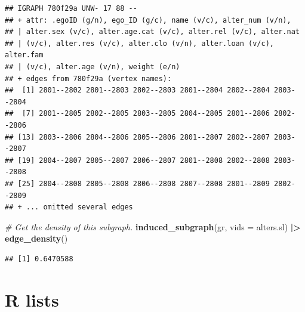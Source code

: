 \documentclass[
]{book}
\newenvironment{Shaded}{\begin{snugshade}}{\end{snugshade}}
\newcommand{\AttributeTok}[1]{\textcolor[rgb]{0.13,0.29,0.53}{#1}}
\newcommand{\CommentTok}[1]{\textcolor[rgb]{0.56,0.35,0.01}{\textit{#1}}}
\newcommand{\FunctionTok}[1]{\textcolor[rgb]{0.13,0.29,0.53}{\textbf{#1}}}
\newcommand{\NormalTok}[1]{#1}
\newcommand{\SpecialCharTok}[1]{\textcolor[rgb]{0.81,0.36,0.00}{\textbf{#1}}}
\begin{document}
\begin{verbatim}
## IGRAPH 780f29a UNW- 17 88 -- 
## + attr: .egoID (g/n), ego_ID (g/c), name (v/c), alter_num (v/n),
## | alter.sex (v/c), alter.age.cat (v/c), alter.rel (v/c), alter.nat
## | (v/c), alter.res (v/c), alter.clo (v/n), alter.loan (v/c), alter.fam
## | (v/c), alter.age (v/n), weight (e/n)
## + edges from 780f29a (vertex names):
##  [1] 2801--2802 2801--2803 2802--2803 2801--2804 2802--2804 2803--2804
##  [7] 2801--2805 2802--2805 2803--2805 2804--2805 2801--2806 2802--2806
## [13] 2803--2806 2804--2806 2805--2806 2801--2807 2802--2807 2803--2807
## [19] 2804--2807 2805--2807 2806--2807 2801--2808 2802--2808 2803--2808
## [25] 2804--2808 2805--2808 2806--2808 2807--2808 2801--2809 2802--2809
## + ... omitted several edges
\end{verbatim}

\begin{Shaded}
\begin{Highlighting}[]
\CommentTok{\# Get the density of this subgraph.}
\FunctionTok{induced\_subgraph}\NormalTok{(gr, }\AttributeTok{vids =}\NormalTok{ alters.sl) }\SpecialCharTok{|\textgreater{}} 
  \FunctionTok{edge\_density}\NormalTok{()}
\end{Highlighting}
\end{Shaded}

\begin{verbatim}
## [1] 0.6470588
\end{verbatim}

\hypertarget{lists}{%
\section{R lists}\label{lists}}
\end{document}
